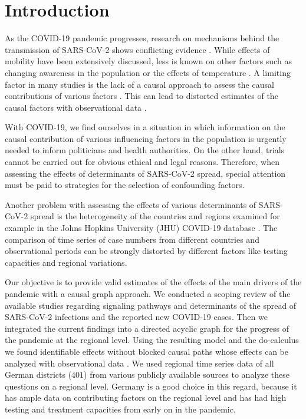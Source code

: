 \documentclass[10pt,letterpaper]{article}
\begin{document}
\linenumbers

\section*{Introduction}\label{introduction}
As the COVID-19 pandemic progresses, research on mechanisms behind the transmission of SARS-CoV-2 shows conflicting evidence \cite{who2020report, Chinazzi395, guan2020clinical}. While effects of mobility have been extensively discussed, less is known on other factors such as changing awareness in the population
\cite{higgins_correlations_2020, li_retrospective_2020, yuan_trends_2020}
or the effects of temperature
\cite{bannister-tyrrell_preliminary_2020, demongeot_temperature_2020, liu_impact_2020}. A limiting factor in many studies is the lack of a causal approach to
assess the causal contributions of various factors
\cite{Greenland1999}. This can lead to distorted estimates of the
causal factors with observational data
\cite{Greenland1999, schipf_directed_2011, textor_robust_2017}.

With COVID-19, we find ourselves in a situation in which information on
the causal contribution of various influencing factors in the population
is urgently needed to inform politicians and health authorities. On the
other hand, trials cannot be carried out for obvious ethical and legal
reasons. Therefore, when assessing the effects of determinants of
SARS-CoV-2 spread, special attention must be paid to strategies for the
selection of confounding factors.

Another problem with assessing the effects of various determinants of
SARS-CoV-2 spread is the heterogeneity of the countries and regions
examined for example in the Johns Hopkins University (JHU) COVID-19
database \cite{jhucovid19db2020}. The comparison of time series of case
numbers from different countries and observational periods can be
strongly distorted by different factors like testing capacities and
regional variations.

Our objective is to provide valid estimates of the effects of the main drivers of the pandemic with a causal graph approach. We conducted a scoping review of the available studies regarding signaling pathways and determinants of the spread of SARS-CoV-2 infections and the reported new COVID-19 cases. Then we integrated the current findings into a directed acyclic graph for the progress of the pandemic at the regional level. Using the resulting model and the do-calculus we found identifiable effects without blocked causal paths whose effects can be analyzed with observational data \cite{Pearl_2014}. We used regional time series data of all German districts (\(401\)) from various publicly available sources to analyze these questions on a regional level. Germany is a good choice in this regard, because it has ample data on contributing factors on the regional level and has had high testing and treatment capacities from early on in the pandemic.
\end{document}
